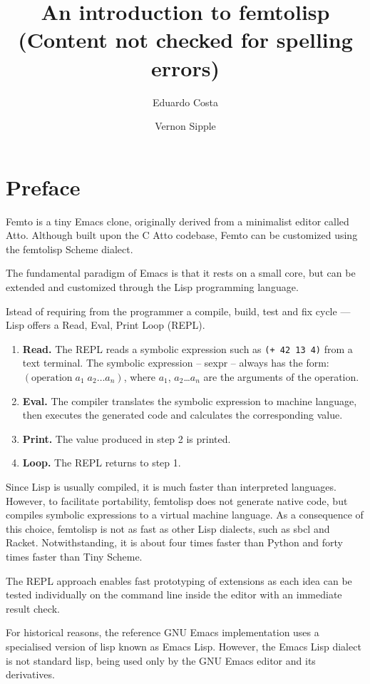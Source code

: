 \documentclass[a4paper,12pt]{book}
\title{An introduction to femtolisp\\
{\normalsize (Content not checked for spelling errors)}}
\author{Eduardo Costa \and Vernon Sipple}
\date{}
\begin{document}
\maketitle
\thispagestyle{empty}

\frontmatter

\chapter*{Preface}

Femto is a tiny Emacs clone,
originally derived from a minimalist
editor called Atto. Although built
upon the C Atto codebase, Femto can
be customized using the femtolisp Scheme dialect.

The fundamental paradigm of Emacs is that it
rests on a small core, but can be
extended and customized through
the Lisp programming language.

Istead of requiring from the programmer a compile,
build, test and fix cycle ---
Lisp offers a Read, Eval, Print Loop (REPL).
\begin{enumerate}
\item {\bf Read.} The REPL reads
a symbolic expression 
such as \verb|(+ 42 13 4)| from
a text terminal. The symbolic expression -- sexpr --
always has the form: $(\textrm{operation}\;a_1\;a_2\ldots a_n)$,
where $a_1$, $a_2$\ldots $a_n$ are the arguments of
the operation.
\item {\bf Eval.} The compiler translates the symbolic
expression to machine language, then executes the
generated code and calculates the corresponding
value.
\item {\bf Print.} The value produced in step 2 is printed.
\item {\bf Loop.} The REPL returns to step 1.
\end{enumerate}

Since Lisp is usually compiled, it is
much faster than interpreted languages.
However, to facilitate portability,
femtolisp does not generate
native code, but compiles symbolic expressions
to a virtual machine language. As a consequence of
this choice, femtolisp is not as fast as other
Lisp dialects, such as sbcl and Racket. Notwithstanding,
it is about four times faster than Python
and forty times faster than Tiny Scheme.

The REPL approach enables fast prototyping
of extensions as each idea can be tested
individually on the command line inside
the editor with an immediate result check.

For historical reasons, the reference GNU
Emacs implementation uses a specialised version of
lisp known as Emacs Lisp.  However, the Emacs Lisp
dialect is not standard lisp, being used
only by the GNU Emacs editor and its
derivatives.
\end{document}
